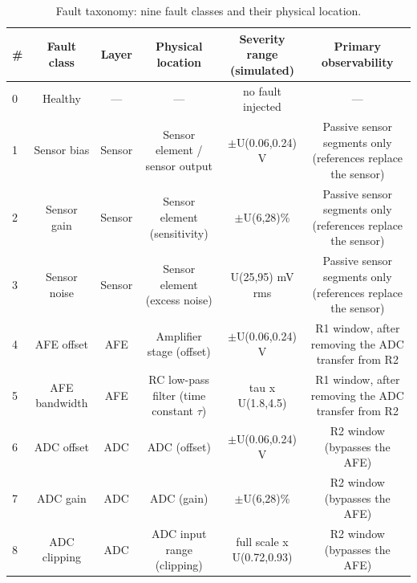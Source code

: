 \begin{table}[H]
\caption{Fault taxonomy: nine fault classes and their physical location.\label{tab:table02_fault_taxonomy}}
\centering
\small
\begin{tabular}{lccccc}
\toprule
\textbf{\#} & \textbf{Fault class} & \textbf{Layer} & \textbf{Physical location} & \textbf{Severity range (simulated)} & \textbf{Primary observability} \\
\midrule
0 & Healthy & --- & --- & no fault injected & --- \\
1 & Sensor bias & Sensor & Sensor element / sensor output & $\pm$U(0.06,0.24) V & Passive sensor segments only (references replace the sensor) \\
2 & Sensor gain & Sensor & Sensor element (sensitivity) & $\pm$U(6,28)\% & Passive sensor segments only (references replace the sensor) \\
3 & Sensor noise & Sensor & Sensor element (excess noise) & U(25,95) mV rms & Passive sensor segments only (references replace the sensor) \\
4 & AFE offset & AFE & Amplifier stage (offset) & $\pm$U(0.06,0.24) V & R1 window, after removing the ADC transfer from R2 \\
5 & AFE bandwidth & AFE & RC low-pass filter (time constant $\tau$) & tau x U(1.8,4.5) & R1 window, after removing the ADC transfer from R2 \\
6 & ADC offset & ADC & ADC (offset) & $\pm$U(0.06,0.24) V & R2 window (bypasses the AFE) \\
7 & ADC gain & ADC & ADC (gain) & $\pm$U(6,28)\% & R2 window (bypasses the AFE) \\
8 & ADC clipping & ADC & ADC input range (clipping) & full scale x U(0.72,0.93) & R2 window (bypasses the AFE) \\
\bottomrule
\end{tabular}
\par\vspace{2pt}
\end{table}

